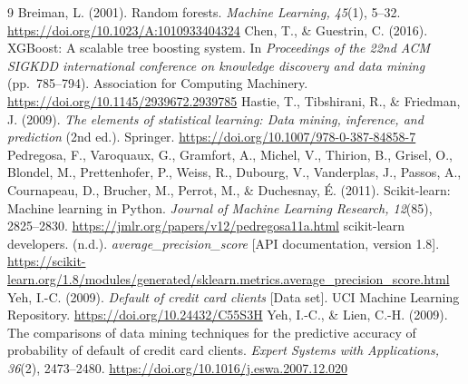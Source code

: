 \documentclass{article}
\begin{document}
\newpage
{\normalsize\raggedright\setlength{\baselineskip}{20pt}
\begin{thebibliography}{9}
 Breiman, L. (2001). Random forests. \emph{Machine Learning, 45}(1), 5--32. \url{https://doi.org/10.1023/A:1010933404324}
 Chen, T., \& Guestrin, C. (2016). XGBoost: A scalable tree boosting system. In \emph{Proceedings of the 22nd ACM SIGKDD international conference on knowledge discovery and data mining} (pp.\ 785--794). Association for Computing Machinery. \url{https://doi.org/10.1145/2939672.2939785}
 Hastie, T., Tibshirani, R., \& Friedman, J. (2009). \emph{The elements of statistical learning: Data mining, inference, and prediction} (2nd ed.). Springer. \url{https://doi.org/10.1007/978-0-387-84858-7}
 Pedregosa, F., Varoquaux, G., Gramfort, A., Michel, V., Thirion, B., Grisel, O., Blondel, M., Prettenhofer, P., Weiss, R., Dubourg, V., Vanderplas, J., Passos, A., Cournapeau, D., Brucher, M., Perrot, M., \& Duchesnay, \mbox{\'E.} (2011). Scikit-learn: Machine learning in Python. \emph{Journal of Machine Learning Research, 12}(85), 2825--2830. \url{https://jmlr.org/papers/v12/pedregosa11a.html}
 scikit-learn developers. (n.d.). \emph{average\_precision\_score} [API documentation, version 1.8]. \url{https://scikit-learn.org/1.8/modules/generated/sklearn.metrics.average_precision_score.html}
 Yeh, I.-C. (2009). \emph{Default of credit card clients} [Data set]. UCI Machine Learning Repository. \url{https://doi.org/10.24432/C55S3H}
 Yeh, I.-C., \& Lien, C.-H. (2009). The comparisons of data mining techniques for the predictive accuracy of probability of default of credit card clients. \emph{Expert Systems with Applications, 36}(2), 2473--2480. \url{https://doi.org/10.1016/j.eswa.2007.12.020}
\end{thebibliography}}
\end{document}
